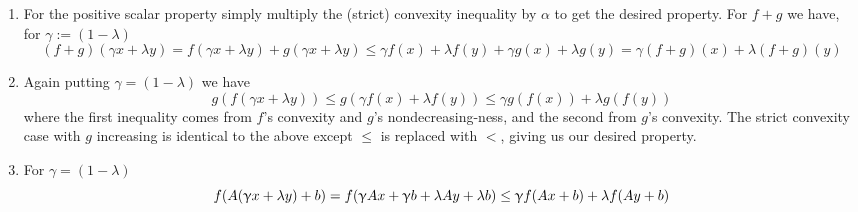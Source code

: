 \documentclass{article}
\newenvironment{ex}[1]
  {\renewcommand\theexercise{#1}\exercise}
  {\endexercise}
\begin{document}
\begin{ex}{7.3} %
  \begin{enumerate}[label=(\alph*)] \, \\
    \item
      For the positive scalar property simply multiply the (strict) convexity inequality by $\alpha$ to get the desired property. For $f + g$ we have, for $\gamma := (1-\lambda)$
      $$
      (f+g)(\gamma x + \lambda y) = f(\gamma x + \lambda y) + g(\gamma x + \lambda y) \le \gamma f(x) + \lambda f(y) + \gamma g(x) + \lambda g(y) = \gamma (f + g)(x) + \lambda (f+g)(y)
      $$
    \item
      Again putting $\gamma = (1-\lambda)$ we have
      $$
      g(f(\gamma x + \lambda y)) \le g(\gamma f(x) + \lambda f(y)) \le \gamma g(f(x)) + \lambda g(f(y))
      $$
      where the first inequality comes from $f$'s convexity and $g$'s nondecreasing-ness, and the second from $g$'s convexity. The strict convexity case with $g$ increasing is identical to the above except $\le$ is replaced with $<$, giving us our desired property.
    \item For $\gamma = (1-\lambda)$
      $$
      f\parens{A\parens{\gamma x + \lambda y} + b} = f\parens{\gamma Ax + \gamma b + \lambda Ay + \lambda b} \le \gamma f(Ax + b) + \lambda f(Ay + b)
      $$
  \end{enumerate}
\end{ex} %
\end{document}
